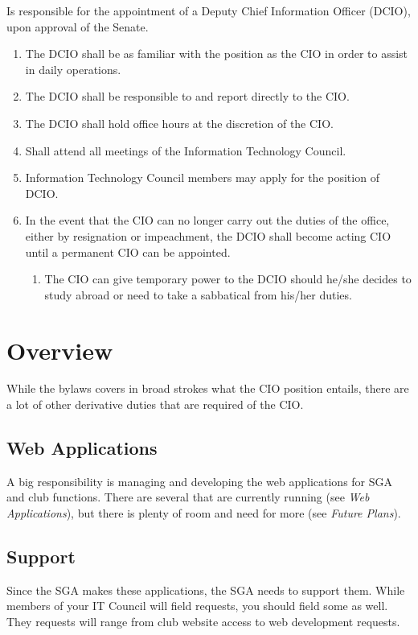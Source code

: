 \documentclass[11pt]{report}
\begin{document}
\begin{enumerate}
{				Is responsible for the appointment of a Deputy Chief Information Officer (DCIO), upon approval of the Senate.
				\begin{enumerate}
					\item{The DCIO shall be as familiar with the position as the CIO in order to assist in} daily operations.
					\item{The DCIO shall be responsible to and report directly to the CIO.}
					\item{The DCIO shall hold office hours at the discretion of the CIO.}
					\item{Shall attend all meetings of the Information Technology Council.}
					\item{Information Technology Council members may apply for the position of DCIO.}
					\item{
						In the event that the CIO can no longer carry out the duties of the office, either by resignation or impeachment, the DCIO shall become acting CIO until a permanent CIO can be appointed.
						\begin{enumerate}
							\item{The CIO can give temporary power to the DCIO should he/she decides to
study abroad or need to take a sabbatical from his/her duties. }
						\end{enumerate}
					}
				\end{enumerate}
			}
		\end{enumerate}
	\section{Overview}
		While the bylaws covers in broad strokes what the CIO position entails, there are a lot of other derivative duties that are required of the CIO.

		\subsection{Web Applications}
			A big responsibility is managing and developing the web applications for SGA and club functions. There are several that are currently running (see \textit{Web Applications}), but there is plenty of room and need for more (see \textit{Future Plans}).
		
		\subsection{Support}
			Since the SGA makes these applications, the SGA needs to support them. While members of your IT Council will field requests, you should field some as well. They requests will range from club website access to web development requests.
			
\end{document}
